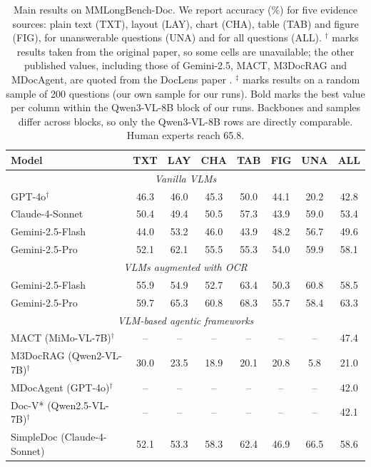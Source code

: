 \documentclass[conference]{IEEEtran}
\begin{document}
\begin{table}[t]
\caption{Main results on MMLongBench-Doc. We report accuracy (\%) for five evidence sources: plain text (TXT), layout (LAY), chart (CHA), table (TAB) and figure (FIG), for unanswerable questions (UNA) and for all questions (ALL). $^\dagger$ marks results taken from the original paper, so some cells are unavailable; the other published values, including those of Gemini-2.5, MACT, M3DocRAG and MDocAgent, are quoted from the DocLens paper \cite{zhu2025doclens}. $^\ddagger$ marks results on a random sample of 200 questions (our own sample for our runs). Bold marks the best value per column within the Qwen3-VL-8B block of our runs. Backbones and samples differ across blocks, so only the Qwen3-VL-8B rows are directly comparable. Human experts reach 65.8.}
\label{tab:main}
\centering
\footnotesize
\setlength{\tabcolsep}{4.5pt}
\begin{tabular}{@{}lccccccc@{}}
\toprule
Model & TXT & LAY & CHA & TAB & FIG & UNA & ALL \\
\midrule
\multicolumn{8}{c}{\textit{Vanilla VLMs}} \\
GPT-4o$^\dagger$ \cite{ma2024mmlongbench} & 46.3 & 46.0 & 45.3 & 50.0 & 44.1 & 20.2 & 42.8 \\
Claude-4-Sonnet & 50.4 & 49.4 & 50.5 & 57.3 & 43.9 & 59.0 & 53.4 \\
Gemini-2.5-Flash & 44.0 & 53.2 & 46.0 & 43.9 & 48.2 & 56.7 & 49.6 \\
Gemini-2.5-Pro & 52.1 & 62.1 & 55.5 & 55.3 & 54.0 & 59.9 & 58.1 \\
\midrule
\multicolumn{8}{c}{\textit{VLMs augmented with OCR}} \\
Gemini-2.5-Flash & 55.9 & 54.9 & 52.7 & 63.4 & 50.3 & 60.8 & 58.5 \\
Gemini-2.5-Pro & 59.7 & 65.3 & 60.8 & 68.3 & 55.7 & 58.4 & 63.3 \\
\midrule
\multicolumn{8}{c}{\textit{VLM-based agentic frameworks}} \\
MACT (MiMo-VL-7B)$^\dagger$ & -- & -- & -- & -- & -- & -- & 47.4 \\
M3DocRAG (Qwen2-VL-7B)$^\dagger$ & 30.0 & 23.5 & 18.9 & 20.1 & 20.8 & 5.8 & 21.0 \\
MDocAgent (GPT-4o)$^\dagger$ & -- & -- & -- & -- & -- & -- & 42.0 \\
Doc-V* (Qwen2.5-VL-7B)$^\dagger$ \cite{docvstar} & -- & -- & -- & -- & -- & -- & 42.1 \\
SimpleDoc (Claude-4-Sonnet) \cite{jain2025simpledoc} & 52.1 & 53.3 & 58.3 & 62.4 & 46.9 & 66.5 & 58.6 \\

\end{tabular}
\end{table}
\end{document}

